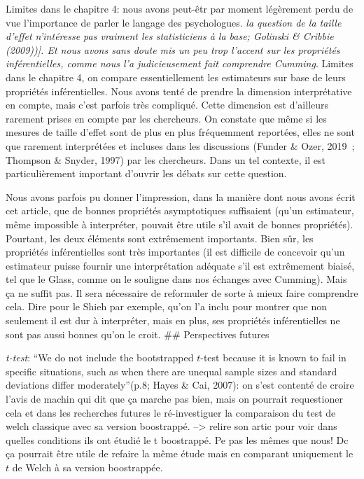 \documentclass[
  12pt,
  french,
]{article}
\begin{document}
Limites dans le chapitre 4: nous avons peut-êtr par moment légèrement
perdu de vue l'importance de parler le langage des psychologues.
\emph{la question de la taille d'effet n'intéresse pas vraiment les
statisticiens à la base; Golinski \& Cribbie (2009)){]}. Et nous avons
sans doute mis un peu trop l'accent sur les propriétés inférentielles,
comme nous l'a judicieusement fait comprendre Cumming}. Limites dans le
chapitre 4, on compare essentiellement les estimateurs sur base de leurs
propriétés inférentielles. Nous avons tenté de prendre la dimension
interprétative en compte, mais c'est parfois très compliqué. Cette
dimension est d'ailleurs rarement prises en compte par les chercheurs.
On constate que même si les mesures de taille d'effet sont de plus en
plus fréquemment reportées, elles ne sont que rarement interprétées et
incluses dans les discussions (Funder \& Ozer, 2019~; Thompson \&
Snyder, 1997) par les chercheurs. Dans un tel contexte, il est
particulièrement important d'ouvrir les débats sur cette question.

Nous avons parfois pu donner l'impression, dans la manière dont nous
avons écrit cet article, que de bonnes propriétés asymptotiques
suffisaient (qu'un estimateur, même impossible à interpréter, pouvait
être utile s'il avait de bonnes propriétés). Pourtant, les deux éléments
sont extrêmement importants. Bien sûr, les propriétés inférentielles
sont très importantes (il est difficile de concevoir qu'un estimateur
puisse fournir une interprétation adéquate s'il est extrêmement biaisé,
tel que le Glass, comme on le souligne dans nos échanges avec Cumming).
Mais ça ne suffit pas. Il sera nécessaire de reformuler de sorte à mieux
faire comprendre cela. Dire pour le Shieh par exemple, qu'on l'a inclu
pour montrer que non seulement il est dur à interpréter, mais en plus,
ses propriétés inférentielles ne sont pas aussi bonnes qu'on le croit.
\#\# Perspectives futures

\color{blue} \emph{t-test}: ``We do not include the bootstrapped
\(t\)-test because it is known to fail in specific situations, such as
when there are unequal sample sizes and standard deviations differ
moderately''(p.8; Hayes \& Cai, 2007): on s'est contenté de croire
l'avis de machin qui dit que ça marche pas bien, mais on pourrait
requestioner cela et dans les recherches futures le ré-investiguer la
comparaison du test de welch classique avec sa version boostrappé.
--\textgreater{} relire son artic pour voir dans quelles conditions ils
ont étudié le t boostrappé. Pe pas les mêmes que nous! Dc ça pourrait
être utile de refaire la même étude mais en comparant uniquement le
\(t\) de Welch à sa version boostrappée.
\end{document}
